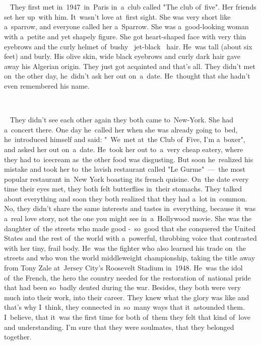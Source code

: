 ~

~

~
They first met in~1947~in~Paris in~a~club called "The club of~five".
Her friends set her up~with him.
It~wasn't love at~first sight.
She was very short like a~sparrow, and everyone called her a~Sparrow.
She was a~good-looking woman with a~petite and yet shapely figure.
She got heart-shaped face with very thin eyebrows and the curly helmet of~bushy ~jet-black ~hair.
He~was tall (about six feet) and burly.
His olive skin, wide black eyebrows and curly dark hair gave away his Algerian origin.
They just got acqainted and that's all.
They didn't met on~the other day, he~didn't ask her out on~a~date.
He~thought that she hadn't even remembered his name.

~

~
They didn't see each other again they both came to~New-York.
She had a~concert there.
One day he~called her when she was already going to~bed, he~introduced himself and said: "~We~met at~the Club of~Five, I'm a~boxer", and asked her out on~a~date.
He~took her out to~a~very cheap eatery, where they had to~icecream as~the other food was disgusting.
But soon he~realized his mistake and took her to~the lavish restaurant called "Le Gurme"~---~the most popular restaurant in~New York boasting its french quisine.
On~the date every time their eyes met, they both felt butterflies in~their stomachs.
They talked about everything and soon they both realized that they had a~lot in~common.
No, they didn't share the same interests and tastes in~everything, because it~was a~real love story, not the one you might see in~a~Hollywood movie.
She was the daughter of~the streets who made good -~so~good that she conquered the United States and the rest of~the world with a~powerful, throbbing voice that contrasted with her tiny, frail body.
He~was the fighter who also learned his trade on~the streets and who won the world middleweight championship, taking the title away from Tony Zale at~Jersey City's Roosevelt Stadium in~1948.
He~was the idol of~the French, the hero the country needed for the restoration of~national pride that had been so~badly dented during the war.
Besides, they both were very much into their work, into their career.
They knew what the glory was like and that's why I~think, they connected in~so~many ways that it~astounded them.
I~believe, that it~was the first time for both of~them they felt that kind of~love and understanding.
I'm sure that they were soulmates, that they belonged together.

